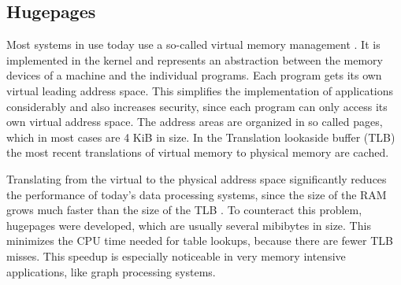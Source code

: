 \subsection{Hugepages}
Most systems in use today use a so-called virtual memory management \cite{virtual_memory}.
It is implemented in the kernel and represents an abstraction between the memory devices of a machine and the individual programs.
Each program gets its own virtual leading address space.
This simplifies the implementation of applications considerably and also increases security, since each program can only access its own virtual address space.
The address areas are organized in so called pages, which in most cases are 4 KiB in size.
In the Translation lookaside buffer (TLB) the most recent translations of virtual memory to physical memory are cached.

Translating from the virtual to the physical address space significantly reduces the performance of today's data processing systems, since the size of the RAM grows much faster than the size of the TLB \cite{hugepages, superpages}.
To counteract this problem, hugepages were developed, which are usually several mibibytes in size.
This minimizes the CPU time needed for table lookups, because there are fewer TLB misses.
This speedup is especially noticeable in very memory intensive applications, like graph processing systems.

